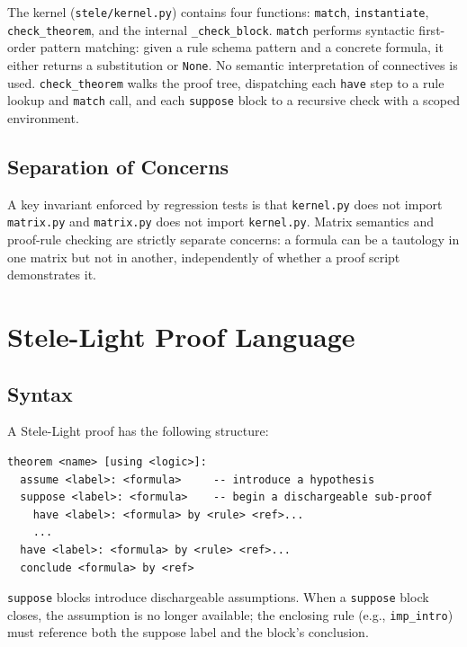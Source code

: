 \documentclass[11pt,a4paper]{article}
\theoremstyle{definition}
\theoremstyle{plain}
\newcommand{\kernel}{\texttt{kernel.py}}
\begin{document}
The kernel (\texttt{stele/kernel.py}) contains four functions:
\texttt{match}, \texttt{instantiate}, \texttt{check\_theorem},
and the internal \texttt{\_check\_block}.
\texttt{match} performs syntactic first-order pattern matching:
given a rule schema pattern and a concrete formula, it either
returns a substitution or \texttt{None}.
No semantic interpretation of connectives is used.
\texttt{check\_theorem} walks the proof tree, dispatching each
\texttt{have} step to a rule lookup and \texttt{match} call,
and each \texttt{suppose} block to a recursive check with a
scoped environment.

\subsection{Separation of Concerns}

A key invariant enforced by regression tests is that
\kernel{} does not import \texttt{matrix.py} and
\texttt{matrix.py} does not import \kernel{}.
Matrix semantics and proof-rule checking are strictly
separate concerns: a formula can be a tautology in one
matrix but not in another, independently of whether a
proof script demonstrates it.

\section{Stele-Light Proof Language}
\label{sec:language}

\subsection{Syntax}

A Stele-Light proof has the following structure:

\begin{lstlisting}
theorem <name> [using <logic>]:
  assume <label>: <formula>     -- introduce a hypothesis
  suppose <label>: <formula>    -- begin a dischargeable sub-proof
    have <label>: <formula> by <rule> <ref>...
    ...
  have <label>: <formula> by <rule> <ref>...
  conclude <formula> by <ref>
\end{lstlisting}

\noindent
\texttt{suppose} blocks introduce dischargeable assumptions.
When a \texttt{suppose} block closes, the assumption is no
longer available; the enclosing rule (e.g., \texttt{imp\_intro})
must reference both the suppose label and the block's conclusion.
\end{document}
